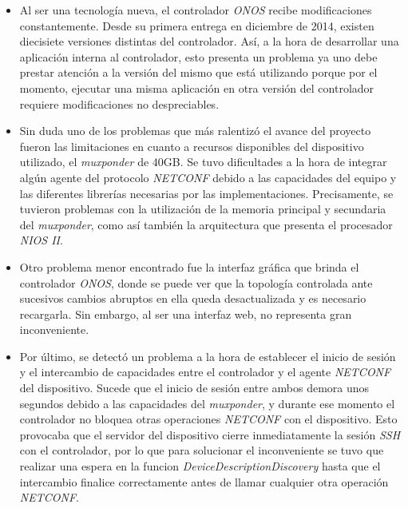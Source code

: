 \begin{itemize}
    
    \item Al ser una tecnología nueva, el controlador \textit{ONOS} recibe modificaciones constantemente. Desde su primera entrega en diciembre de 2014, existen diecisiete versiones distintas del controlador. Así, a la hora de desarrollar una aplicación interna al controlador, esto presenta un problema ya uno debe prestar atención a la versión del mismo que está utilizando porque por el momento, ejecutar una misma aplicación en otra versión del controlador requiere modificaciones no despreciables.     
    
    \item Sin duda uno de los problemas que más ralentizó el avance del proyecto fueron las limitaciones en cuanto a recursos disponibles del dispositivo utilizado, el \textit{muxponder} de 40GB. Se tuvo dificultades a la hora de integrar algún agente del protocolo \textit{NETCONF} debido a las capacidades del equipo y las diferentes librerías necesarias por las implementaciones. Precisamente, se tuvieron problemas con la utilización de la memoria principal y secundaria del \textit{muxponder}, como así también la arquitectura que presenta el procesador \textit{NIOS II}.

    \item Otro problema menor encontrado fue la interfaz gráfica que brinda el controlador \textit{ONOS}, donde se puede ver que la topología controlada ante sucesivos cambios abruptos en ella queda desactualizada y es necesario recargarla. Sin embargo, al ser una interfaz web, no representa gran inconveniente.
    
    \item Por último, se detectó un problema a la hora de establecer el inicio de sesión y el intercambio de capacidades entre el controlador y el agente \textit{NETCONF} del dispositivo. Sucede que el inicio de sesión entre ambos demora unos segundos debido a las capacidades del \textit{muxponder}, y durante ese momento el controlador no bloquea otras operaciones \textit{NETCONF} con el dispositivo. Esto provocaba que el servidor del dispositivo cierre inmediatamente la sesión \textit{SSH} con el controlador, por lo que para solucionar el inconveniente se tuvo que realizar una espera en la funcion \textit{DeviceDescriptionDiscovery} hasta que el intercambio finalice correctamente antes de llamar cualquier otra operación \textit{NETCONF}.
    
\end{itemize}

